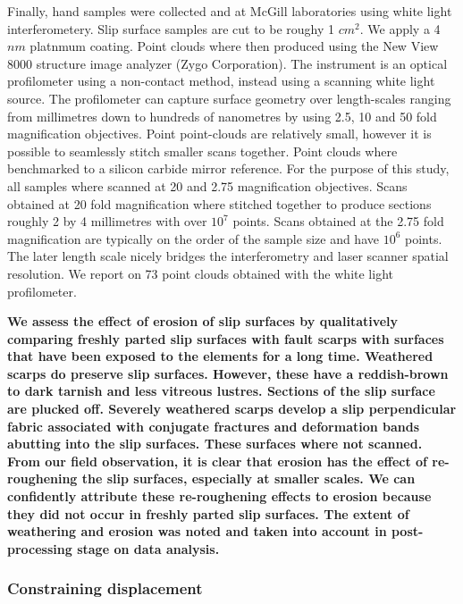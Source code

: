 \documentclass[12pt,a4paper]{article}
\begin{document}
Finally, hand samples were collected and at McGill laboratories using white light interferometery. Slip surface samples are cut to be roughy 1 $cm^2$. We apply a 4 $nm$ platnmum coating. Point clouds where then produced using the New View 8000 structure image analyzer (Zygo Corporation). The instrument is an optical profilometer using a non-contact method, instead using a scanning white light source. The profilometer can capture surface geometry over length-scales ranging from millimetres down to hundreds of nanometres by using 2.5, 10 and 50 fold magnification objectives. Point point-clouds are relatively small, however it is possible to seamlessly stitch smaller scans together. Point clouds where benchmarked to a silicon carbide mirror reference. For the purpose of this study, all samples where scanned at 20 and 2.75 magnification objectives. Scans obtained at 20 fold magnification where stitched together to produce sections roughly 2 by 4 millimetres with over $10^7$ points. Scans obtained at the 2.75 fold magnification are typically on the order of the sample size and have $10^6$ points. The later length scale nicely bridges the interferometry and laser scanner spatial resolution. We report on 73 point clouds obtained with the white light profilometer.

\textbf{We assess the effect of erosion of slip surfaces by qualitatively comparing freshly parted slip surfaces with fault scarps with surfaces that have been exposed to the elements for a long time. Weathered scarps do preserve slip surfaces. However, these have a reddish-brown to dark tarnish and less vitreous lustres. Sections of the slip surface are plucked off. Severely weathered scarps develop a slip perpendicular fabric associated with conjugate fractures and deformation bands abutting into the slip surfaces. These surfaces where not scanned. From our field observation, it is clear that erosion has the effect of re-roughening the slip surfaces, especially at smaller scales. We can confidently attribute these re-roughening effects to erosion because they did not occur in freshly parted slip surfaces. The extent of weathering and erosion was noted and taken into account in post-processing stage on data analysis.}

	\subsubsection{Constraining displacement}
\end{document}
